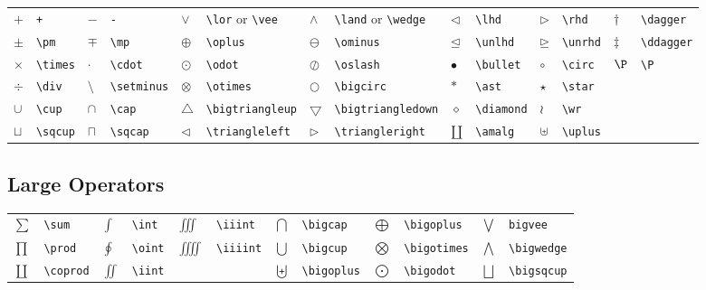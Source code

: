 \documentclass[10pt, english]{article}
\begin{document}
	\begin{center}
		\scriptsize
	\begin{tabular}{ll|ll|ll|ll|ll|ll|ll}
		$+$ & \verb|+| & $-$ & \verb|-| & $\lor$ & \verb|\lor| or \verb|\vee| & $\land$ & \verb|\land| or \verb|\wedge| & $\lhd$ & \verb|\lhd| & $\rhd$ & \verb|\rhd| & $\dagger$ & \verb|\dagger| \\ 
		$\pm$ & \verb|\pm| & $\mp$ & \verb|\mp| & $\oplus$ & \verb|\oplus| & $\ominus$ & \verb|\ominus| & $\unlhd$ & \verb|\unlhd| & $\unrhd$ & \verb|\unrhd| & $\ddagger$ & \verb|\ddagger| \\
		$\times$ & \verb|\times| & $\cdot$ & \verb|\cdot| & $\odot$ & \verb|\odot| & $\oslash$ & \verb|\oslash| & $\bullet$ & \verb|\bullet| & $\circ$ & \verb|\circ| & $\P$ & \verb|\P| \\
		$\div$ & \verb|\div| & $\setminus$ & \verb|\setminus| & $\otimes$ & \verb|\otimes| & $\bigcirc$ & \verb|\bigcirc| & $\ast$ & \verb|\ast| & $\star$ & \verb|\star| \\
		$\cup$ & \verb|\cup| & $\cap$ & \verb|\cap| & $\bigtriangleup$ & \verb|\bigtriangleup| & $\bigtriangledown$ & \verb|\bigtriangledown| & $\diamond$ & \verb|\diamond| & $\wr$ & \verb|\wr| \\ 
		$\sqcup$ & \verb|\sqcup| & $\sqcap$ & \verb|\sqcap| & $\triangleleft$ & \verb|\triangleleft| & $\triangleright$ & \verb|\triangleright| & $\amalg$ & \verb|\amalg| & $\uplus$ & \verb|\uplus| \\
	\end{tabular}
	\end{center}

	\subsection{Large Operators}

	\begin{center}
		\scriptsize
	\begin{tabular}{ll|ll|ll|ll|ll|ll}
		$\sum$ & \verb|\sum| & $\int$ & \verb|\int| & $\iiint$ & \verb|\iiint| & $\bigcap$ & \verb|\bigcap| & $\bigoplus$ & \verb|\bigoplus| & $\bigvee$ & \verb|bigvee|\\
		$\prod$ & \verb|\prod| & $\oint$ & \verb|\oint| & $\iiiint$ & \verb|\iiiint| & $\bigcup$ & \verb|\bigcup| & $\bigotimes$ & \verb|\bigotimes| & $\bigwedge$ & \verb|\bigwedge|\\
		$\coprod$ & \verb|\coprod| & $\iint$ & \verb|\iint| & & & $\biguplus$ & \verb|\bigoplus| & $\bigodot$ & \verb|\bigodot| & $\bigsqcup$ & \verb|\bigsqcup|\\
	\end{tabular}
	\end{center}
\end{document}

